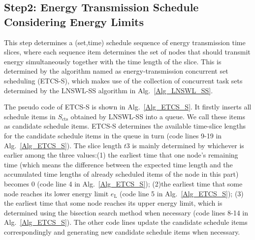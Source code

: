 \documentclass[journal,10pt]{IEEEtran}
\begin{document}
\subsection{Step2: Energy Transmission Schedule Considering Energy Limits}

This step determines a (set,time) schedule sequence of energy transmission time slices, where each sequence item determines the set of nodes that should transmit energy simultaneously together with the time length of the slice. This is determined by the algorithm named as energy-transmission concurrent set scheduling (ETCS-S), which makes use of the collection of concurrent task sets determined by the LNSWL-SS algorithm in Alg.~\ref{Alg_LNSWL_SS}. 

The pseudo code of ETCS-S is shown in Alg.~\ref{Alg_ETCS_S}. It firstly inserts all schedule items in $S_\text{cts}$ obtained by LNSWL-SS into a queue. We call these items as candidate schedule items. ETCS-S determines the available time-slice lengths for the candidate schedule items in the queue in turn (code lines 9-19 in Alg.~\ref{Alg_ETCS_S}). The slice length $t3$ is mainly determined by whichever is earlier among the three values:(1) the earliest time that one node's remaining time (which means the difference between the expected time length and the accumulated time lengths of already scheduled items of the node in this part) becomes 0 (code line 4 in Alg.~\ref{Alg_ETCS_S}); (2)the earliest time that some node reaches its lower energy limit $e_\text{L}$ (code line 5 in Alg.~\ref{Alg_ETCS_S}); (3) the earliest time that some node reaches its upper energy limit, which is determined using the bisection search method when necessary (code lines 8-14 in Alg.~\ref{Alg_ETCS_S}). The other code lines update the candidate schedule items correspondingly and generating new candidate schedule items when necessary.
\end{document}
